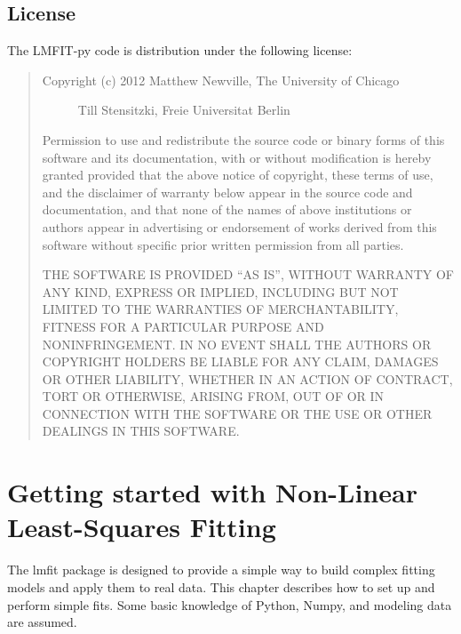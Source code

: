 \documentclass[letterpaper,10pt,english]{sphinxmanual}
\begin{document}
\section{License}
\label{installation:license}
The LMFIT-py code is distribution under the following license:
\begin{quote}
\begin{description}
\item[{Copyright (c) 2012 Matthew Newville, The University of Chicago}] \leavevmode
Till Stensitzki, Freie Universitat Berlin

\end{description}

Permission to use and redistribute the source code or binary forms of this
software and its documentation, with or without modification is hereby
granted provided that the above notice of copyright, these terms of use,
and the disclaimer of warranty below appear in the source code and
documentation, and that none of the names of above institutions or
authors appear in advertising or endorsement of works derived from this
software without specific prior written permission from all parties.

THE SOFTWARE IS PROVIDED ``AS IS'', WITHOUT WARRANTY OF ANY KIND, EXPRESS OR
IMPLIED, INCLUDING BUT NOT LIMITED TO THE WARRANTIES OF MERCHANTABILITY,
FITNESS FOR A PARTICULAR PURPOSE AND NONINFRINGEMENT.  IN NO EVENT SHALL
THE AUTHORS OR COPYRIGHT HOLDERS BE LIABLE FOR ANY CLAIM, DAMAGES OR OTHER
LIABILITY, WHETHER IN AN ACTION OF CONTRACT, TORT OR OTHERWISE, ARISING
FROM, OUT OF OR IN CONNECTION WITH THE SOFTWARE OR THE USE OR OTHER
DEALINGS IN THIS SOFTWARE.
\end{quote}


\chapter{Getting started with Non-Linear Least-Squares Fitting}
\label{parameters::doc}\label{parameters:getting-started-with-non-linear-least-squares-fitting}
The lmfit package is designed to provide a simple way to build complex
fitting models and apply them to real data.  This chapter describes how to
set up and perform simple fits.  Some basic knowledge of Python, Numpy, and
modeling data are assumed.
\end{document}
